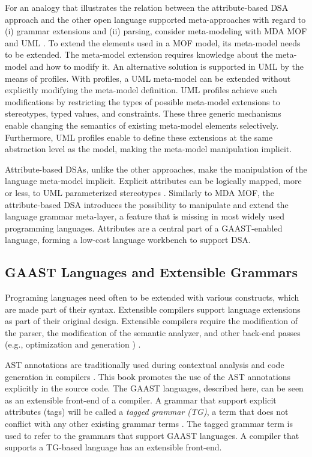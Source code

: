 For an analogy that illustrates the relation between the attribute-based DSA approach and the other open language supported meta-approaches \cite{cardelli94extensible,batory98jts,java.jse,java.epp,java.maya,java.openJava} with regard to (i) grammar extensions and (ii) parsing, consider meta-modeling with MDA MOF \cite{mda.frankel,www.mof} and UML \cite{www.uml}. To extend the elements used in a MOF model, its meta-model needs to be extended. The meta-model extension requires knowledge about the meta-model and how to modify it. An alternative solution is supported in UML by the means of profiles. With profiles, a UML meta-model can be extended without explicitly modifying the meta-model definition. UML profiles achieve such modifications by restricting the types of possible meta-model extensions to stereotypes, typed values, and constraints. These three generic mechanisms enable changing the semantics of existing meta-model elements selectively. Furthermore, UML profiles enable to define these extensions at the same abstraction level as the model, making the meta-model manipulation implicit. 

Attribute-based DSAs, unlike the other approaches, make the manipulation of the language meta-model implicit. Explicit attributes can be logically mapped, more or less, to UML parameterized stereotypes . Similarly to MDA MOF, the attribute-based DSA introduces the possibility to manipulate and extend the language grammar meta-layer, a feature that is missing in most widely used programming languages. Attributes are a central part of a GAAST-enabled language, forming a low-cost language workbench \cite{lang.workbench} to support DSA. 

\subsection{GAAST Languages and Extensible Grammars}
\label{sec.ext.grammars}
Programing languages need often to be extended with various constructs, which are made part of their syntax. Extensible compilers \cite{extensible.compilers} support language extensions as part of their original design. Extensible compilers require the modification of the parser, the modification of the semantic analyzer, and other back-end passes (e.g., optimization and generation \cite{muchnick.97}) \cite{extensible.compilers}.

AST annotations are traditionally used during contextual analysis and code generation in compilers \cite{java.compilers.book,morr.02}. This book promotes the use of the AST annotations explicitly \cite{java.explicit.programming} in the source code. The GAAST languages, described here, can be seen as an extensible front-end of a compiler.
%
A grammar that support explicit attributes (tags) will be called a \textit{tagged grammar (TG)}, a term that does not conflict with any other existing grammar terms \cite{Parsing.Techniques.90}. The tagged grammar term is used to refer to the grammars that support GAAST languages. A compiler that supports a TG-based language has an extensible front-end. 

